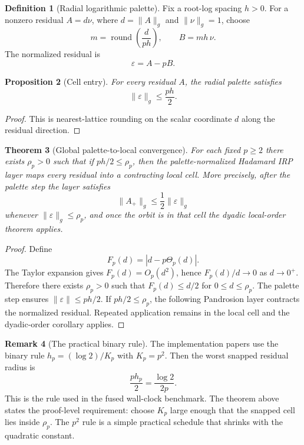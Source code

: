 \documentclass[10pt,a4paper]{article}
\theoremstyle{plain}
\newtheorem{theorem}{Theorem}[section]
\newtheorem{proposition}[theorem]{Proposition}
\theoremstyle{definition}
\newtheorem{definition}[theorem]{Definition}
\newtheorem{remark}[theorem]{Remark}
\begin{document}
\begin{definition}[Radial logarithmic palette]
Fix a root-log spacing $h>0$.  For a nonzero residual $A=d\nu$, where
$d=\|A\|_g$ and $\|\nu\|_g=1$, choose
\[
  m=\operatorname{round}\!\left(\frac{d}{ph}\right),
  \qquad B=mh\,\nu.
\]
The normalized residual is
\[
  \varepsilon=A-pB.
\]
\end{definition}

\begin{proposition}[Cell entry]
For every residual $A$, the radial palette satisfies
\[
  \|\varepsilon\|_g\le \frac{ph}{2}.
\]
\end{proposition}

\begin{proof}
This is nearest-lattice rounding on the scalar coordinate $d$ along the residual
direction.
\end{proof}

\begin{theorem}[Global palette-to-local convergence]
For each fixed $p\ge2$ there exists $\rho_p>0$ such that if $ph/2\le\rho_p$,
then the palette-normalized Hadamard IRP layer maps every residual into a
contracting local cell.  More precisely, after the palette step the layer
satisfies
\[
  \|A_+\|_g\le \frac12\|\varepsilon\|_g
\]
whenever $\|\varepsilon\|_g\le\rho_p$, and once the orbit is in that cell the
dyadic local-order theorem applies.
\end{theorem}

\begin{proof}
Define
\[
  F_p(d)=|d-p\Theta_p(d)|.
\]
The Taylor expansion gives $F_p(d)=O_p(d^2)$, hence $F_p(d)/d\to0$ as
$d\to0^+$.  Therefore there exists $\rho_p>0$ such that
$F_p(d)\le d/2$ for $0\le d\le\rho_p$.  The palette step ensures
$\|\varepsilon\|\le ph/2$.  If $ph/2\le\rho_p$, the following Pandrosion layer
contracts the normalized residual.  Repeated application remains in the local
cell and the dyadic-order corollary applies.
\end{proof}

\begin{remark}[The practical binary rule]
The implementation papers use the binary rule $h_p=(\log2)/K_p$ with
$K_p=p^2$.  Then the worst snapped residual radius is
\[
  \frac{ph_p}{2}=\frac{\log2}{2p}.
\]
This is the rule used in the fused wall-clock benchmark.  The theorem above
states the proof-level requirement: choose $K_p$ large enough that the snapped
cell lies inside $\rho_p$.  The $p^2$ rule is a simple practical schedule that
shrinks with the quadratic constant.
\end{remark}
\end{document}
